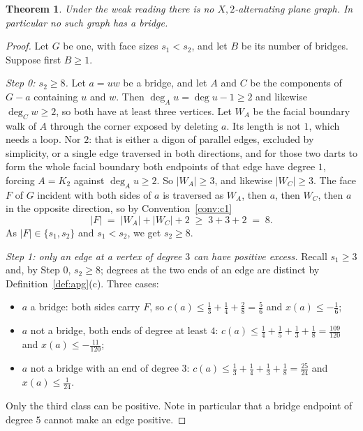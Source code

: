 \documentclass[11pt,a4paper]{amsart}
\theoremstyle{plain}
\newtheorem{theorem}{Theorem}[section]
\theoremstyle{definition}
\begin{document}
\begin{theorem}\label{thm:nobridge}
Under the weak reading there is no $X,2$-alternating plane graph. In particular
no such graph has a bridge.
\end{theorem}

\begin{proof}
Let $G$ be one, with face sizes $s_1 < s_2$, and let $B$ be its number of
bridges. Suppose first $B \ge 1$.

\smallskip
\emph{Step 0: $s_2 \ge 8$.} Let $a = uw$ be a bridge, and let $A$ and $C$ be the
components of $G - a$ containing $u$ and $w$. Then $\deg_A u = \deg u - 1 \ge 2$
and likewise $\deg_C w \ge 2$, so both have at least three vertices. Let $W_A$
be the facial boundary walk of $A$ through the corner exposed by deleting $a$.
Its length is not $1$, which needs a loop. Nor $2$: that is either a digon of
parallel edges, excluded by simplicity, or a single edge traversed in both
directions, and for those two darts to form the whole facial boundary both
endpoints of that edge have degree $1$, forcing $A = K_2$ against
$\deg_A u \ge 2$. So $|W_A| \ge 3$, and likewise $|W_C| \ge 3$. The face $F$ of
$G$ incident with both sides of $a$ is traversed as $W_A$, then $a$, then $W_C$,
then $a$ in the opposite direction, so by Convention~\ref{conv:c1}
\[
  |F| \;=\; |W_A| + |W_C| + 2 \;\ge\; 3 + 3 + 2 \;=\; 8 .
\]
As $|F| \in \{s_1,s_2\}$ and $s_1 < s_2$, we get $s_2 \ge 8$.

\smallskip
\emph{Step 1: only an edge at a vertex of degree $3$ can have positive excess.}
Recall $s_1 \ge 3$ and, by Step 0, $s_2 \ge 8$; degrees at the two ends of an
edge are distinct by Definition~\ref{def:apg}(c). Three cases:
\begin{itemize}
  \item $a$ a bridge: both sides carry $F$, so
        $c(a) \le \tfrac13+\tfrac14+\tfrac28 = \tfrac56$ and
        $x(a) \le -\tfrac16$;
  \item $a$ not a bridge, both ends of degree at least $4$:
        $c(a) \le \tfrac14+\tfrac15+\tfrac13+\tfrac18 = \tfrac{109}{120}$ and
        $x(a) \le -\tfrac{11}{120}$;
  \item $a$ not a bridge with an end of degree $3$:
        $c(a) \le \tfrac13+\tfrac14+\tfrac13+\tfrac18 = \tfrac{25}{24}$ and
        $x(a) \le \tfrac1{24}$.
\end{itemize}
Only the third class can be positive. Note in particular that a bridge endpoint
of degree $5$ cannot make an edge positive.


\end{proof}
\end{document}
